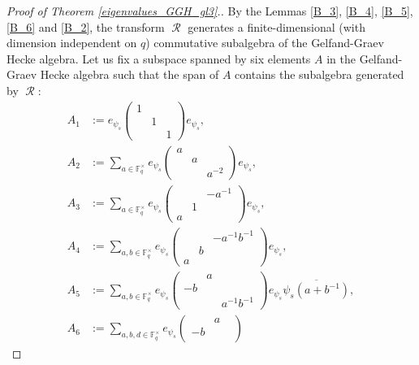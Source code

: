 \documentclass[12pt,reqno]{amsart}
\theoremstyle{definition}
\theoremstyle{remark}
\numberwithin{equation}{section}
\DeclareMathOperator{\R}{\mathcal{R}}
\begin{document}
\begin{proof}[Proof of Theorem \ref{eigenvalues_GGH_gl3}.]
    By the Lemmas \ref{B_3}, \ref{B_4}, \ref{B_5}, \ref{B_6} and \ref{B_2}, the transform $\R$ generates a finite-dimensional (with dimension independent on $q$) commutative subalgebra of the Gelfand-Graev Hecke algebra. Let us fix a subspace spanned by six elements $A$ in the Gelfand-Graev Hecke algebra such that the span of $A$ contains the subalgebra generated by $\R$:
    \begin{align*}
        A_1 &:= e_{\psi_s}\begin{pmatrix}
            1 & &\\
            & 1 &\\
            & & 1
        \end{pmatrix}e_{\psi_s},\\
        A_2 &:= \sum_{a \in \mathbb{F}_q^\times} e_{\psi_s} \begin{pmatrix}
            a & & \\
            & a & \\
            & & a^{-2}
        \end{pmatrix}e_{\psi_s},\\
        A_3 &:=\sum_{a \in \mathbb{F}_q^\times} e_{\psi_s} \begin{pmatrix}
            & & -a^{-1}\\
            & 1 &\\
            a & &
        \end{pmatrix} e_{\psi_s},\\
        A_4 &:= \sum_{a, b \in \mathbb{F}_q^\times} e_{\psi_s} \begin{pmatrix}
            & & -a^{-1}b^{-1}\\
            & b &\\
            a & &
        \end{pmatrix} e_{\psi_s},\\
        A_5 &:= \sum_{a, b \in \mathbb{F}_q^\times} e_{\psi_s} \begin{pmatrix}
            & a & \\
            -b & & \\
            & & a^{-1}b^{-1}
        \end{pmatrix} e_{\psi_s} \overline{\psi_s(a+b^{-1})},\\
        A_6 &:= \sum_{a, b,d \in \mathbb{F}_q^\times}e_{\psi_s} \begin{pmatrix}
            & a &\\
            -b & &\\

\end{pmatrix}
\end{align*}
\end{proof}
\end{document}
